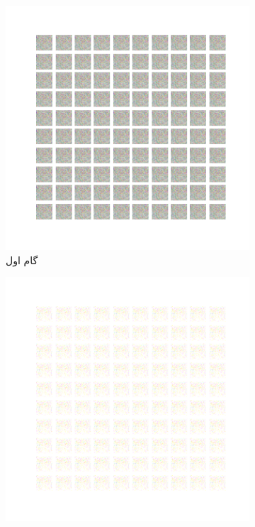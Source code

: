 \documentclass[12pt, a4paper]{book}
\begin{document}
\begin{figure}[h]
    \begin{subfigure}{0.3\linewidth}
        \includegraphics[width=\linewidth]{images/fcgan/noisy_std5.0/generated_img_01.png}
        \caption{گام اول}
    \end{subfigure}
    \begin{subfigure}{0.3\linewidth}
        \includegraphics[width=\linewidth]{images/fcgan/noisy_std5.0/generated_img_15.png}

\end{subfigure}
\end{figure}
\end{document}

